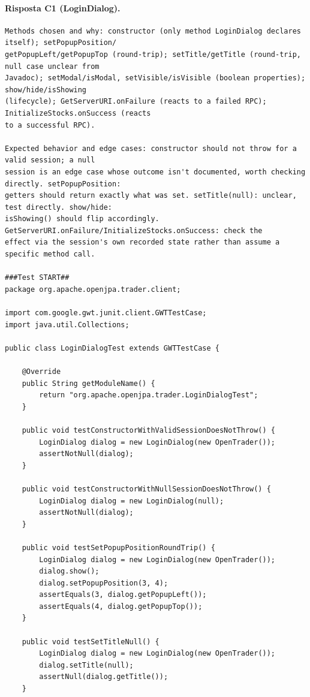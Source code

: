 \paragraph*{Risposta C1 (LoginDialog).}
\label{risposta:ld-c1}
\begin{lstlisting}
Methods chosen and why: constructor (only method LoginDialog declares itself); setPopupPosition/
getPopupLeft/getPopupTop (round-trip); setTitle/getTitle (round-trip, null case unclear from
Javadoc); setModal/isModal, setVisible/isVisible (boolean properties); show/hide/isShowing
(lifecycle); GetServerURI.onFailure (reacts to a failed RPC); InitializeStocks.onSuccess (reacts
to a successful RPC).

Expected behavior and edge cases: constructor should not throw for a valid session; a null
session is an edge case whose outcome isn't documented, worth checking directly. setPopupPosition:
getters should return exactly what was set. setTitle(null): unclear, test directly. show/hide:
isShowing() should flip accordingly. GetServerURI.onFailure/InitializeStocks.onSuccess: check the
effect via the session's own recorded state rather than assume a specific method call.

###Test START##
package org.apache.openjpa.trader.client;

import com.google.gwt.junit.client.GWTTestCase;
import java.util.Collections;

public class LoginDialogTest extends GWTTestCase {

    @Override
    public String getModuleName() {
        return "org.apache.openjpa.trader.LoginDialogTest";
    }

    public void testConstructorWithValidSessionDoesNotThrow() {
        LoginDialog dialog = new LoginDialog(new OpenTrader());
        assertNotNull(dialog);
    }

    public void testConstructorWithNullSessionDoesNotThrow() {
        LoginDialog dialog = new LoginDialog(null);
        assertNotNull(dialog);
    }

    public void testSetPopupPositionRoundTrip() {
        LoginDialog dialog = new LoginDialog(new OpenTrader());
        dialog.show();
        dialog.setPopupPosition(3, 4);
        assertEquals(3, dialog.getPopupLeft());
        assertEquals(4, dialog.getPopupTop());
    }

    public void testSetTitleNull() {
        LoginDialog dialog = new LoginDialog(new OpenTrader());
        dialog.setTitle(null);
        assertNull(dialog.getTitle());
    }


\end{lstlisting}
